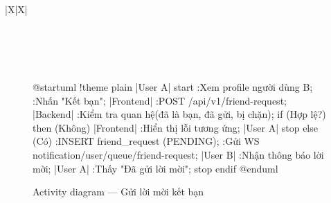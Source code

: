 \documentclass[12pt,a4paper]{report}
\begin{document}
\begin{xltabular}{\textwidth}{|X|X|}
\hline
{} \\
\hline
{} \\
\hline
{} \\
\hline
{} \\
\hline
{} \\
\hline
\caption{Mô tả chức năng UC05}
\end{xltabular}
\renewcommand{\arraystretch}{1}

\begin{figure}[H]
    \centering
    \begin{plantuml}
        @startuml
        !theme plain
        |User A|
        start
        :Xem profile người dùng B;
        :Nhấn "Kết bạn";
        |Frontend|
        :POST /api/v1/friend-request;
        |Backend|
        :Kiểm tra quan hệ\n(đã là bạn, đã gửi, bị chặn);
        if (Hợp lệ?) then (Không)
          |Frontend|
          :Hiển thị lỗi tương ứng;
          |User A|
          stop
        else (Có)
          :INSERT friend_request (PENDING);
          :Gửi WS notification /user/queue/friend-request;
          |User B|
          :Nhận thông báo lời mời;
          |User A|
          :Thấy "Đã gửi lời mời";
          stop
        endif
        @enduml
    \end{plantuml}
    \caption{Activity diagram --- Gửi lời mời kết bạn}
\end{figure}
\end{document}
